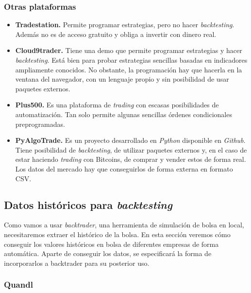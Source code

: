 		
		\subsubsection{Otras plataformas}

		\begin{itemize}
			\item \textbf{Tradestation.} Permite programar estrategias, pero no hacer \textit{backtesting}. Adem\'as no es de acceso gratuito y obliga a invertir con dinero real.
			
			\item \textbf{Cloud9trader.} Tiene una demo que permite programar estrategias y hacer \textit{backtesting}. Est\'a bien para probar estrategias sencillas basadas en indicadores ampliamente conocidos. No obstante, la programaci\'on hay que hacerla en la ventana del navegador, con un lenguaje propio y sin posibilidad de usar paquetes externos.
			
			\item \textbf{Plus500.} Es una plataforma de \textit{trading} con escasas posibilidades de automatizaci\'on. Tan solo permite algunas  sencillas \'ordenes condicionales preprogramadas.
			
			\item \textbf{PyAlgoTrade.} Es un proyecto desarrollado en \textit{Python} disponible en \textit{Github}. Tiene posibilidad de \textit{backtesting}, de utilizar paquetes externos y, en el caso de estar haciendo \textit{trading} con Bitcoins, de comprar y vender estos de forma real. Los datos del mercado hay que conseguirlos de forma externa en formato CSV.
		\end{itemize}
		
	
	\subsection{Datos hist\'oricos para \textit{backtesting}}\label{sec:get_data}
		
		Como vamos a usar \textit{backtrader}, una herramienta de simulaci\'on de bolsa en local, necesitaremos extraer el hist\'orico de la bolsa. En esta secci\'on veremos c\'omo conseguir los valores hist\'oricos en bolsa de diferentes empresas de forma autom\'atica. Aparte de conseguir los datos, se especificar\'a la forma de incorporarlos a backtrader para su posterior uso.\\
		
		\subsubsection{Quandl}
		
